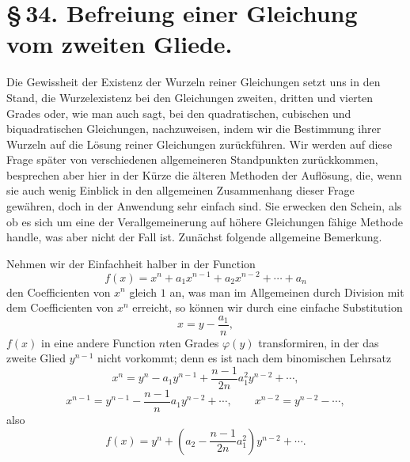 \documentclass[11pt]{article}
\begin{document}
\section*{\S\,34. Befreiung einer Gleichung vom zweiten Gliede.}

Die Gewissheit der Existenz der Wurzeln reiner Gleichungen setzt uns in den Stand, die Wurzelexistenz bei den Gleichungen zweiten, dritten und vierten Grades oder, wie man auch sagt, bei den quadratischen, cubischen und biquadratischen Gleichungen, nachzuweisen, indem wir die Bestimmung ihrer Wurzeln auf die Lösung reiner Gleichungen zurückführen. Wir werden auf diese Frage später von verschiedenen allgemeineren Standpunkten zurückkommen, besprechen aber hier in der Kürze die älteren Methoden der Auflösung, die, wenn sie auch wenig Einblick in den allgemeinen Zusammenhang dieser Frage gewähren, doch in der Anwendung sehr einfach sind. Sie erwecken den Schein, als ob es sich um eine der Verallgemeinerung auf höhere Gleichungen fähige Methode handle, was aber nicht der Fall ist. Zunächst folgende allgemeine Bemerkung.

Nehmen wir der Einfachheit halber in der Function
\begin{equation}
f(x)=x^n+a_1x^{n-1}+a_2x^{n-2}+\cdots+a_n
\tag{1}
\end{equation}
den Coefficienten von $x^n$ gleich $1$ an, was man im Allgemeinen durch Division mit dem Coefficienten von $x^n$ erreicht, so können wir durch eine einfache Substitution
\begin{equation}
x=y-\frac{a_1}{n},
\tag{2}
\end{equation}
$f(x)$ in eine andere Function $n$ten Grades $\varphi(y)$ transformiren, in der das zweite Glied $y^{n-1}$ nicht vorkommt; denn es ist nach dem binomischen Lehrsatz
\[
 x^n=y^n-a_1y^{n-1}+\frac{n-1}{2n}a_1^2y^{n-2}+\cdots,
\]
\[
 x^{n-1}=y^{n-1}-\frac{n-1}{n}a_1y^{n-2}+\cdots,
 \qquad x^{n-2}=y^{n-2}-\cdots,
\]
also
\[
 f(x)=y^n+\left(a_2-\frac{n-1}{2n}a_1^2\right)y^{n-2}+\cdots.
\]
\end{document}

